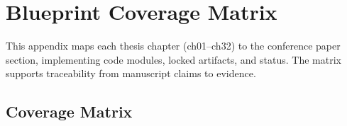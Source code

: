 \chapter{Blueprint Coverage Matrix}
\label{app:blueprint-coverage}

This appendix maps each thesis chapter (ch01--ch32) to the conference paper section, implementing code modules, locked artifacts, and status. The matrix supports traceability from manuscript claims to evidence.

\section{Coverage Matrix}

